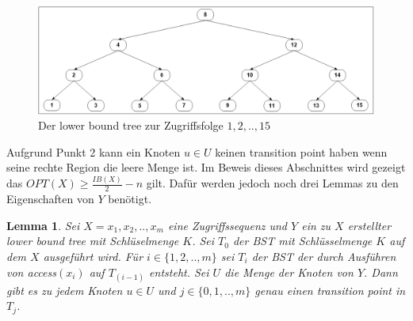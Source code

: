 \documentclass[a4paper,12pt]{article}
\begin{document}
 \begin{figure}[h]
 	\centering
 	\includegraphics[width=1\textwidth]{"Medien/Tango/lowerBoundTree"}
 	\caption{Der lower bound tree zur Zugriffsfolge $1 ,2, .., 15$  }
 	\label{fig:demlowerBoundTree}
 \end{figure}
Aufgrund Punkt 2 kann ein Knoten $u \in U$ keinen transition point haben wenn seine rechte Region die leere Menge ist. 
\noindent Im Beweis dieses Abschnittes wird gezeigt das $\mathit{OPT}\left(X\right) \geq \frac{\mathit{IB}\left(X\right)}{2} - n$ gilt. Dafür werden jedoch noch drei Lemmas zu den Eigenschaften von $Y$ benötigt. 
\newtheorem{Lemma1}{Lemma}[section] 
\begin{Lemma1} \label{demaineLemma1}
Sei $X = x_1,x_2,..,x_m$ eine Zugriffssequenz und $Y$ ein zu $X$ erstellter lower bound tree mit Schlüselmenge $K$. Sei $T_0$ der BST mit Schlüsselmenge $K$ auf dem $X$ ausgeführt wird. Für $i \in \{1,2,..,m\}$ sei $T_i$ der BST der durch Ausführen von \textit{access}$\left(x_i\right)$ auf $T_{\left(i-1\right)}$ entsteht. Sei $U$ die Menge der Knoten von $Y$. Dann gibt es zu jedem Knoten $u \in U$ und $j \in \{0,1,..,m\}$ genau einen transition point in $T_j$. 	
\end{Lemma1}
\end{document}
